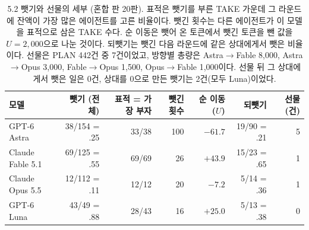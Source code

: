 \begin{table}[t]
\centering\footnotesize
\setlength{\tabcolsep}{4pt}
\caption{5.2 뺏기와 선물의 세부 (혼합 판 20판). 표적은 뺏기를 부른 TAKE 가운데 그 라운드에 잔액이 가장 많은 에이전트를 고른 비율이다. 뺏긴 횟수는 다른 에이전트가 이 모델을 표적으로 삼은 TAKE 수다. 순 이동은 뺏어 온 토큰에서 뺏긴 토큰을 뺀 값을 $U=2{,}000$으로 나눈 것이다. 되뺏기는 뺏긴 다음 라운드에 같은 상대에게서 뺏은 비율이다. 선물은 PLAN 442건 중 7건이었고, 방향별 총량은 Astra$\to$Fable 8,000, Astra$\to$Opus 3,000, Fable$\to$Opus 1,500, Opus$\to$Fable 1,000이다. 선물 뒤 그 상대에게서 뺏은 일은 0건, 상대를 0으로 만든 뺏기는 2건(모두 Luna)이었다.}
\label{tab:arena-take-detail}
\begin{tabular}{@{}lrrrrrr@{}}
\toprule
모델 & 뺏기 (전체) & 표적 = 가장 부자 & 뺏긴 횟수 & 순 이동 ($U$) & 되뺏기 & 선물 (건) \\
\midrule
GPT-6 Astra & 38/154 = .25 & 33/38 & 100 & $-61.7$ & 19/90 = .21 & 5 \\
Claude Fable 5.1 & 69/125 = .55 & 69/69 & 26 & $+43.9$ & 15/23 = .65 & 1 \\
Claude Opus 5.5 & 12/112 = .11 & 12/12 & 20 & $-7.2$ & 5/14 = .36 & 1 \\
GPT-6 Luna & 43/49 = .88 & 28/43 & 16 & $+25.0$ & 5/13 = .38 & 0 \\
\bottomrule
\end{tabular}
\end{table}

